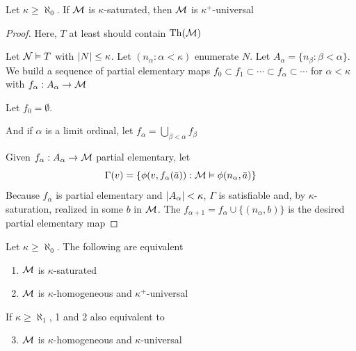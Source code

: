 \documentclass[11pt]{article}
\begin{document}
\begin{lemma}[]
\label{lemma4.3.17}
Let \(\kappa\ge\aleph_0\). If \(\mathcal{M}\) is \(\kappa\)-saturated, then \(\mathcal{M}\) is \(\kappa^+\)-universal
\end{lemma}

\begin{proof}
Here, \(T\) at least should contain \(\operatorname{Th}(\mathcal{M})\)

Let \(\mathcal{N}\vDash T\) with \(\abs{N}\le\kappa\). Let \((n_\alpha:\alpha<\kappa)\) enumerate \(N\). Let \(A_\alpha=\{n_\beta:\beta<\alpha\}\). We
build a sequence of partial elementary maps \(f_0\subset f_1\subset\cdots\subset f_\alpha\subset\cdots\) for \(\alpha<\kappa\) with \(f_\alpha:A_\alpha\to\mathcal{M}\)

Let \(f_0=\emptyset\).

And if \(\alpha\) is a limit ordinal, let \(f_\alpha=\bigcup_{\beta<\alpha}f_\beta\)

Given \(f_\alpha:A_\alpha\to\mathcal{M}\) partial elementary, let
\begin{equation*}
\Gamma(v)=\{\phi(v,f_\alpha(\bara)):\calm\vDash\phi(n_\alpha,\bara)\}
\end{equation*}
Because \(f_\alpha\) is partial elementary and \(\abs{A_\alpha}<\kappa\), \(\Gamma\) is satisfiable and, by
\(\kappa\)-saturation, realized in some \(b\) in \(\mathcal{M}\). The \(f_{\alpha+1}=f_\alpha\cup\{(n_\alpha,b)\}\) is the desired
partial elementary map
\end{proof}

\begin{theorem}[]
Let \(\kappa\ge\aleph_0\). The following are equivalent
\begin{enumerate}
\item \(\mathcal{M}\) is \(\kappa\)-saturated
\item \(\mathcal{M}\) is \(\kappa\)-homogeneous and \(\kappa^+\)-universal
\end{enumerate}


If \(\kappa\ge\aleph_1\), 1 and 2 also equivalent to
\begin{enumerate}
\setcounter{enumi}{2}
\item \(\mathcal{M}\) is \(\kappa\)-homogeneous and \(\kappa\)-universal
\end{enumerate}
\end{theorem}
\end{document}
